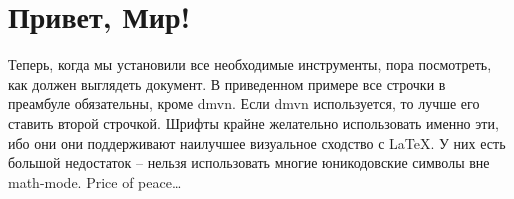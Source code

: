 \section{Привет, Мир!}

Теперь, когда мы установили все необходимые инструменты, пора
посмотреть, как должен выглядеть документ. В приведенном примере все
строчки в преамбуле обязательны, кроме {\ttfamily dmvn}. Если dmvn
используется, то лучше его ставить второй строчкой.  Шрифты крайне
желательно использовать именно эти, ибо они они поддерживают наилучшее
визуальное сходство с \LaTeX. У них есть большой недостаток -- нельзя
использовать многие юникодовские символы вне math-mode.  Price of
peace…


